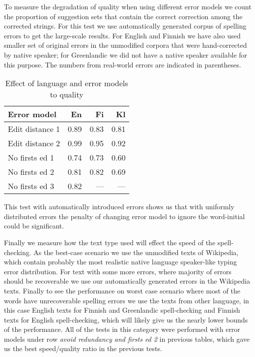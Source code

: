 \documentclass[11pt]{article}
\begin{document}
To measure the degradation of quality when using different error models we
count the proportion of suggestion sets that contain the correct correction
among the corrected strings. For this test we use automatically generated corpus
of spelling errors to get the large-scale results. For English and Finnish we
have also used smaller set of original errors in the unmodified corpora that
were hand-corrected by native speaker; for Greenlandic we did not have a native
speaker available for this purpose. The numbers from real-world errors are 
indicated in parentheses.

\begin{table}[h]
\begin{center}
\begin{scriptsize}
\begin{tabular}{|l|rrr|}
\hline
\bf Error model & \bf En & \bf Fi & \bf Kl\\ 
\hline
\hline
\hline
Edit distance 1 &
0.89&0.83&0.81
\\
Edit distance 2 &
0.99&0.95&0.92
\\
No firsts ed 1 & 
0.74&0.73&0.60
\\
No firsts ed 2 &
0.81&0.82&0.69
\\
No firsts ed 3 &
0.82&---&---
\\
\end{tabular}
\end{scriptsize}
\end{center}
\caption{\label{table:error-model-vs-language} Effect of language and 
error models to quality}
\end{table}

This test with automatically introduced errors shows us that with uniformly
distributed errors the penalty of changing error model to ignore the
word-initial could be significant.

Finally we measure how the text type used will effect the speed of the
spell-checking. As the best-case scenario we use the unmodified texts of
Wikipedia, which contain probably the most realistic native language
speaker-like typing error distribution. For text with some more errors, where
majority of errors should be recoverable we use our automatically generated
errors in the Wikipedia texts. Finally to see the performance on worst case
scenario where most of the words have unrecoverable spelling errors we use the
texts from other language, in this case English texts for Finnish and 
Greenlandic spell-checking and Finnish texts for English spell-checking, which
will likely give us the nearly lower bounds of the performance. All of the
tests in this category were performed with error models under row
\emph{avoid redundancy and firsts ed 2} in previous tables, which gave us 
the best speed/quality ratio in the previous tests.
\end{document}
